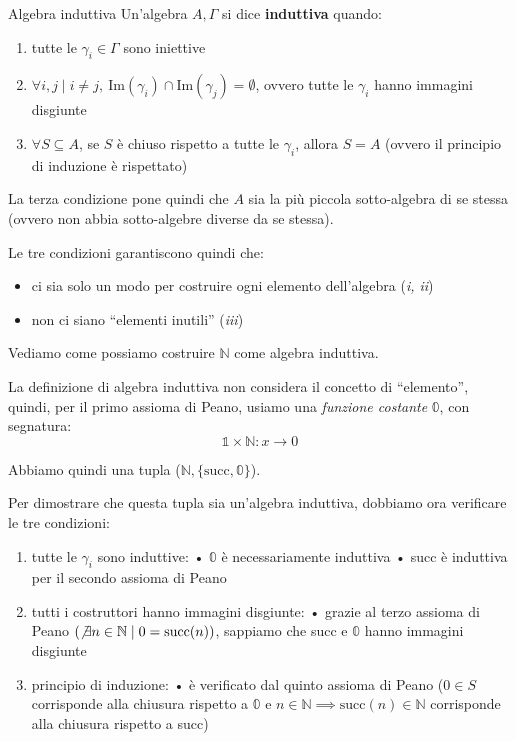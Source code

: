 \documentclass[a4paper,11pt]{report}
\begin{document}
\begin{defframe}{Algebra induttiva}{}
    Un'algebra \( A, \Gamma \) si dice \textbf{induttiva} quando:
    \begin{enumerate}
        \item tutte le \( \gamma_i \in \Gamma\) sono iniettive
        \item \( \forall i, j \mid i \neq j , \ \text{Im}(\gamma_i) \cap \text{Im}(\gamma_j) = \emptyset \), ovvero tutte le \( \gamma_i \) hanno immagini disgiunte
        \item \( \forall S\subseteq A \), se \( S \) è chiuso rispetto a tutte le \( \gamma_i \), allora \( S = A \) (ovvero il principio di induzione è rispettato)   
    \end{enumerate}
    \begin{gframe}{}
        La terza condizione pone quindi che \( A \) sia la più piccola sotto-algebra di se stessa (ovvero non abbia sotto-algebre diverse da se stessa).
    \end{gframe}       
    \begin{gframe}{}
        Le tre condizioni garantiscono quindi che:
        \begin{itemize}
            \item ci sia solo un modo per costruire ogni elemento dell'algebra (\textit{i, ii})
            \item non ci siano ``elementi inutili'' (\textit{iii})
        \end{itemize}
    \end{gframe}

\end{defframe}

Vediamo come possiamo costruire \( \mathbb{N} \) come algebra induttiva.

La definizione di algebra induttiva non considera il concetto di ``elemento'', quindi, per il primo assioma di Peano, usiamo una \textit{funzione costante} \( \mathbb{0} \), con segnatura:
\[\mathbb{1} \times \mathbb{N} : x\to 0 \]

Abbiamo quindi una tupla (\( \mathbb{N}, \{\text{succ}, \mathbb{0}\} \)).

Per dimostrare che  questa tupla sia un'algebra induttiva, dobbiamo ora verificare le tre condizioni:
\begin{enumerate}
    \item tutte le \( \gamma_i \) sono induttive:
        \subitem • \( \mathbb{0} \) è necessariamente induttiva
        \subitem • succ è induttiva per il secondo assioma di Peano
    \item tutti i costruttori hanno immagini disgiunte:
        \subitem • grazie al terzo assioma di Peano \((\not\exists n \in \mathbb{N} \mid 0 = \text{succ}(n)) \), sappiamo che succ e \( \mathbb{0} \) hanno immagini disgiunte
    \item principio di induzione:
        \subitem • è verificato dal quinto assioma di Peano (\( 0 \in S\) corrisponde alla chiusura rispetto a \(\mathbb{0} \) e \( n \in \mathbb{N} \implies \text{succ}(n) \in \mathbb{N}\) corrisponde alla chiusura rispetto a succ)
\end{enumerate}
\end{document}
